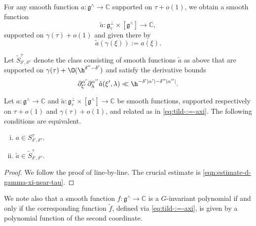 For any smooth function $a : \mathfrak{g}^\wedge \rightarrow \mathbb{C}$ supported on $\tau + o(1)$, we obtain a smooth function
\[
  \tilde{a} : \mathfrak{g}_\tau^\perp \times [\mathfrak{g}^\wedge] \rightarrow \mathbb{C},
\]
supported on $\gamma(\tau) + o(1)$ and given there by
\begin{equation}\label{eq:tild-:=-axi}
  \tilde{a}(\gamma(\xi)) := a(\xi).
\end{equation}

Let $\tilde{S}^{\tau}_{\delta ', \delta ''}$ denote the class consisting of smooth functions $\tilde{a}$ as above that are supported on $\gamma(\tau) + \O(\h^{ \delta '' - \delta'})$ and satisfy the derivative bounds
\begin{equation}\label{eqn:tilde-a-deriv-bounds}
  \partial_{\xi '}^{\alpha'}
  \partial_{\lambda}^{\alpha ''}
  \tilde{a}(\xi ', \lambda )
  \ll
  \h^{- \delta ' |\alpha '|
    - \delta ''| \alpha ''|}.
\end{equation}

\begin{lemma}
  Let $a : \mathfrak{g}^\wedge \rightarrow \mathbb{C}$ and $\tilde{a} : \mathfrak{g}_\tau^{\perp} \times [\mathfrak{g}^\wedge] \rightarrow \mathbb{C}$ be smooth functions, supported respectively on $\tau + o(1)$ and $\gamma(\tau) + o(1)$, and related as in \eqref{eq:tild-:=-axi}.  The following conditions are equivalent.
  \begin{enumerate}[(i)]
  \item $a \in S_{\delta ', \delta ''}^{\tau}$.
  \item $\tilde{a} \in \tilde{S}^{\tau}_{\delta ', \delta ''}$.
  \end{enumerate}
\end{lemma}
\begin{proof}
  We follow the proof of \cite[Lemma 9.9]{2020arXiv201202187N} line-by-line.  The crucial estimate is \eqref{eqn:estimate-d-gamma-xi-near-tau}.  %
\end{proof}
We note also that a smooth function $f : \mathfrak{g}^\wedge \rightarrow \mathbb{C}$ is a $G$-invariant polynomial if and only if the corresponding function $\tilde{f}$, defined via \eqref{eq:tild-:=-axi}, is given by a polynomial function of the second coordinate.

